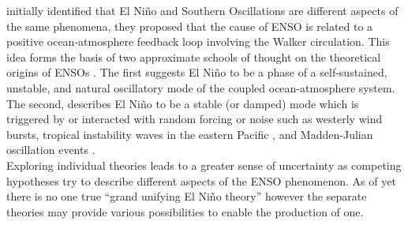 \documentclass[12pt, onecolumn]{revtex4}    %
\begin{document}
\cite{doi:10.1175/1520-04931969097} initially identified that El Ni\~{n}o and Southern Oscillations are different aspects of the same phenomena, they proposed that the cause of ENSO is related to a positive ocean-atmosphere feedback loop involving the Walker circulation. This idea forms the basis of two approximate schools of thought on the theoretical origins of ENSOs \citep{wang2017nino}. The first suggests El Ni\~{n}o to be a phase of a self-sustained, unstable, and natural oscillatory mode of the coupled ocean-atmosphere system. The second, describes El Ni\~{n}o to be a stable (or damped) mode which is triggered by or interacted with random forcing or noise such as westerly wind bursts, tropical instability waves in the eastern Pacific \citep{An:2008aa}, and Madden-Julian oscillation events \citep{doi:10.1175/JAS4029.1}. \\

Exploring individual theories leads to a greater sense of uncertainty as competing hypotheses try to describe different aspects of the ENSO phenomenon.  As of yet there is no one true ``grand unifying El Ni\~{n}o theory'' however the separate theories may provide various possibilities to enable the production of one.  \\






\newpage

\nocite{ruddiman_climate}


\end{document}
